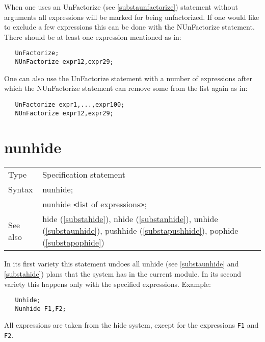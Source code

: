 \noindent When one uses an UnFactorize (see \ref{substaunfactorize}) 
statement without arguments all expressions will be marked for being 
unfactorized. If one would like to exclude a few expressions this can be 
done with the NUnFactorize statement. There should be at least one expression 
mentioned as in:
\begin{verbatim}
   UnFactorize;
   NUnFactorize expr12,expr29;
\end{verbatim}
One can also use the UnFactorize statement with a number of expressions after 
which the NUnFactorize statement can remove some from the list again as in:
\begin{verbatim}
   UnFactorize expr1,...,expr100;
   NUnFactorize expr12,expr29;
\end{verbatim}

\vspace{10mm}


\section{nunhide}
\label{substanunhide}

\noindent \begin{tabular}{ll}
Type & Specification statement\\
Syntax & nunhide; \\
       & nunhide {\tt<}list of expressions{\tt>};
\\ See also & hide (\ref{substahide}),
              nhide (\ref{substanhide}),
              unhide (\ref{substaunhide}),
              pushhide (\ref{substapushhide}),
              pophide (\ref{substapophide})
\end{tabular} \vspace{4mm}

\noindent In its first variety this statement undoes all 
unhide (see \ref{substaunhide} and \ref{substahide}) plans 
that the system has in the current module. In its second variety this 
happens only with the specified expressions. Example:
\begin{verbatim}
   Unhide;
   Nunhide F1,F2;
\end{verbatim}
All expressions are taken from the hide system, except for the 
expressions \verb:F1: and \verb:F2:. \vspace{10mm}


